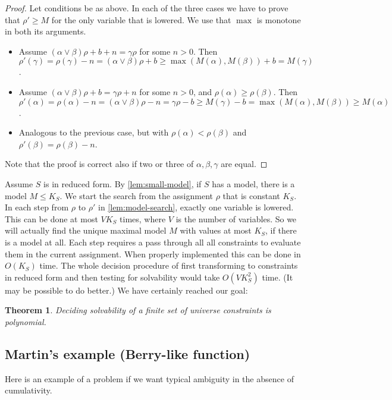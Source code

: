 \documentclass[11pt,a4paper]{article}
\newtheorem{theorem}{Theorem}[section]
\begin{document}
\begin{proof}
Let conditions be as above. In each of the three cases we
have to prove that $\rho'\geq M$ for the only variable that is lowered.
We use that $\max$ is monotone in both its arguments.
\begin{itemize}
\item Assume
$(\alpha\vee\beta)\rho +b+n = \gamma\rho$ for some $n>0$.
Then $\rho'(\gamma) = \rho(\gamma)-n = (\alpha\vee\beta)\rho + b \geq
\max(M(\alpha),M(\beta)) +b = M(\gamma)$.
\item Assume
$(\alpha\vee\beta)\rho +b = \gamma\rho + n$ for some $n>0$, and
$\rho(\alpha)\geq\rho(\beta)$.
Then $\rho'(\alpha) = \rho(\alpha)-n = (\alpha\vee\beta)\rho -n =
\gamma\rho - b \geq M(\gamma)-b = \max(M(\alpha),M(\beta)) \geq M(\alpha)$.
\item Analogous to the previous case, but with $\rho(\alpha)<\rho(\beta)$
and $\rho'(\beta)=\rho(\beta)-n$.
\end{itemize}
Note that the proof is correct also if two or three of $\alpha,\beta,\gamma$
are equal.
\end{proof}

Assume $S$ is in reduced form. By \cref{lem:small-model},
if $S$ has a model, there is a model $M \leq K_S$.
We start the search from the assignment $\rho$ that is constant $K_S$.
In each step from $\rho$ to $\rho'$ in \cref{lem:model-search},
exactly one variable is lowered. This can be done at most $V K_S$ times,
where $V$ is the number of variables. So we will actually find the unique maximal
model $M$ with values at most $K_S$, if there is a model at all.
Each step requires a pass through all
all constraints to evaluate them in the current assignment.
When properly implemented this can be done in $O(K_S)$ time.
The whole decision procedure of first transforming to constraints in reduced
form and then testing for solvability would take $O(V K^2_S)$ time.
(It may be possible to do better.) We have certainly reached our goal:

\begin{theorem}\label{thm:P-solvability}
Deciding solvability of a finite set of universe constraints is polynomial.
\end{theorem}

\subsection*{Martin's example (Berry-like function)}

Here is an example of a problem if we want typical ambiguity in the absence of cumulativity.
\end{document}

